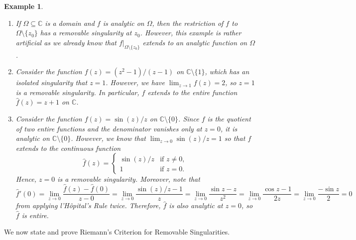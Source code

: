 \documentclass[10pt]{article}
\newcommand{\C}{\mathbb{C}}
\theoremstyle{newstyle}
\newtheorem{exmp}[thm]{Example}
\begin{document}
\begin{exmp}~
\begin{enumerate}[(1)]
    \item If $\Omega \subseteq \C$ is a domain and $f$ is analytic on $\Omega$, then the restriction of 
    $f$ to $\Omega \setminus \{z_0\}$ has a removable singularity at $z_0$. However, this 
    example is rather artificial as we already know that $f|_{\Omega \setminus \{z_0\}}$ extends 
    to an analytic function on $\Omega$. 
    
    \item Consider the function $f(z) = (z^2-1)/(z-1)$ on $\C \setminus \{1\}$, which has an 
    isolated singularity that $z = 1$. However, we have $\lim_{z\to1} f(z) = 2$, so 
    $z = 1$ is a removable singularity. In particular, $f$ extends to the entire function 
    $\hat f(z) = z+1$ on $\C$. 
    
    \item Consider the function $f(z) = \sin(z)/z$ on $\C \setminus \{0\}$. Since $f$ is the quotient 
    of two entire functions and the denominator vanishes only at $z = 0$, it is analytic on 
    $\C \setminus \{0\}$. However, we know that $\lim_{z\to0} \sin(z)/z = 1$ so that 
    $f$ extends to the continuous function 
    \[ \hat f(z) = \begin{cases} \sin(z)/z & \text{if } z \neq 0, \\ 1 & \text{if } z = 0. \end{cases} \]
    Hence, $z = 0$ is a removable singularity. Moreover, note that 
    \[ \hat f'(0) = \lim_{z\to0} \frac{\hat f(z) - \hat f(0)}{z - 0} 
    = \lim_{z\to0} \frac{\sin(z)/z - 1}{z} = \lim_{z\to0} \frac{\sin z - z}{z^2} 
    = \lim_{z\to0} \frac{\cos z - 1}{2z} = \lim_{z\to0} \frac{-\sin z}{2} = 0 \]
    from applying l'H\^opital's Rule twice. Therefore, $\hat f$ is also analytic at $z = 0$, so 
    $\hat f$ is entire. 
\end{enumerate}
\end{exmp}

We now state and prove Riemann's Criterion for Removable Singularities. 
\end{document}
